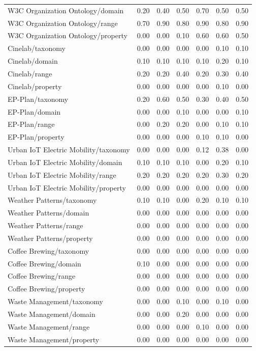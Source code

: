 \begin{tabular}{lcccccc}
W3C Organization Ontology/domain & 0.20 & 0.40 & 0.50 & 0.70 & 0.50 & 0.50 \\
W3C Organization Ontology/range & 0.70 & 0.90 & 0.80 & 0.90 & 0.80 & 0.90 \\
W3C Organization Ontology/property & 0.00 & 0.00 & 0.10 & 0.60 & 0.60 & 0.50 \\
Cinelab/taxonomy & 0.00 & 0.00 & 0.00 & 0.00 & 0.10 & 0.10 \\
Cinelab/domain & 0.10 & 0.10 & 0.10 & 0.10 & 0.20 & 0.10 \\
Cinelab/range & 0.20 & 0.20 & 0.40 & 0.20 & 0.30 & 0.40 \\
Cinelab/property & 0.00 & 0.00 & 0.00 & 0.00 & 0.10 & 0.00 \\
EP-Plan/taxonomy & 0.20 & 0.60 & 0.50 & 0.30 & 0.40 & 0.50 \\
EP-Plan/domain & 0.00 & 0.00 & 0.10 & 0.00 & 0.00 & 0.10 \\
EP-Plan/range & 0.00 & 0.20 & 0.20 & 0.00 & 0.10 & 0.10 \\
EP-Plan/property & 0.00 & 0.00 & 0.00 & 0.10 & 0.10 & 0.00 \\
Urban IoT Electric Mobility/taxonomy & 0.00 & 0.00 & 0.00 & 0.12 & 0.38 & 0.00 \\
Urban IoT Electric Mobility/domain & 0.10 & 0.10 & 0.10 & 0.00 & 0.20 & 0.10 \\
Urban IoT Electric Mobility/range & 0.20 & 0.20 & 0.20 & 0.20 & 0.30 & 0.20 \\
Urban IoT Electric Mobility/property & 0.00 & 0.00 & 0.00 & 0.00 & 0.00 & 0.00 \\
Weather Patterns/taxonomy & 0.10 & 0.10 & 0.00 & 0.20 & 0.10 & 0.10 \\
Weather Patterns/domain & 0.00 & 0.00 & 0.00 & 0.00 & 0.00 & 0.00 \\
Weather Patterns/range & 0.00 & 0.00 & 0.00 & 0.00 & 0.00 & 0.00 \\
Weather Patterns/property & 0.00 & 0.00 & 0.00 & 0.00 & 0.00 & 0.00 \\
Coffee Brewing/taxonomy & 0.00 & 0.00 & 0.00 & 0.00 & 0.00 & 0.00 \\
Coffee Brewing/domain & 0.10 & 0.00 & 0.00 & 0.00 & 0.00 & 0.00 \\
Coffee Brewing/range & 0.00 & 0.00 & 0.00 & 0.00 & 0.00 & 0.00 \\
Coffee Brewing/property & 0.00 & 0.00 & 0.00 & 0.00 & 0.00 & 0.00 \\
Waste Management/taxonomy & 0.00 & 0.00 & 0.10 & 0.00 & 0.10 & 0.00 \\
Waste Management/domain & 0.00 & 0.00 & 0.20 & 0.00 & 0.00 & 0.00 \\
Waste Management/range & 0.00 & 0.00 & 0.00 & 0.10 & 0.00 & 0.00 \\
Waste Management/property & 0.00 & 0.00 & 0.00 & 0.00 & 0.00 & 0.00 \\
\bottomrule
\end{tabular}
